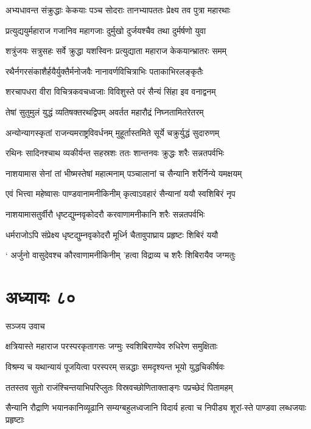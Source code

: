 \twolineshloka
{अभ्यधावन्त संक्रुद्धाः केकयाः पञ्च सोदराः}
{तानभ्यापततः प्रेक्ष्य तव पुत्रा महारथाः}


\twolineshloka
{प्रत्युद्ययुर्महाराज गजानिव महागजाः}
{दुर्मुखो दुर्जयश्चैव तथा दुर्मर्षणो युवा}


\twolineshloka
{शत्रुंजयः सत्रुसहः सर्वे क्रुद्धा यशस्विनः}
{प्रत्युद्याता महाराज केकयान्भ्रातरः समम्}


\twolineshloka
{रथैर्नगरसंकाशैर्हयैर्युक्तैर्मनोजवैः}
{नानावर्णविचित्राभिः पताकाभिरलङ्कृतैः}


\twolineshloka
{शरचापधरा वीरा विचित्रकवचध्वजाः}
{विविशुस्ते परं सैन्यं सिंहा इव वनाद्वनम्}


\twolineshloka
{तेषां सुतुमुलं युद्धं व्यतिषक्तरथद्विपम्}
{अवर्तत महारौद्रं निघ्नतामितरेतरम्}


\twolineshloka
{अन्योन्यागस्कृतां राजन्यमराष्ट्रविवर्धनम्}
{मुहूर्तास्तमिते सूर्ये चक्रुर्युद्धं सुदारुणम्}


\twolineshloka
{रथिनः सादिनश्चाथ व्यकीर्यन्त सहस्रशः}
{ततः शान्तनवः क्रुद्धः शरैः सन्नतपर्वभिः}


\twolineshloka
{नाशयामास सेनां तां भीष्मस्तेषां महात्मनाम्}
{पञ्चालानां च सैन्यानि शरैर्निन्ये यमक्षयम्}


\twolineshloka
{एवं भित्त्वा महेष्वासः पाण्डवानामनीकिनीम्}
{कृत्वाऽवहारं सैन्यानां ययौ स्वशिबिरं नृप}


\twolineshloka
{नाशयामासतुर्वीरौ धृष्टद्युम्नवृकोदरौ}
{करवाणामनीकानि शरैः सन्नतपर्वभिः}


\twolineshloka
{धर्मराजोऽपि संप्रेक्ष्य धृष्टद्युम्नवृकोदरौ}
{मूर्ध्नि चैतावुपाघ्राय प्रहृष्टः शिबिरं ययौ}


\twolineshloka
{` अर्जुनो वासुदेवश्च कौरवाणामनीकिनीम्}
{'हत्वा विद्राव्य च शरैः शिबिरायैव जग्मतुः}


\chapter{अध्यायः ८०}
\twolineshloka
{सञ्जय उवाच}
{}


\twolineshloka
{क्षत्रियास्ते महाराज परस्परकृतागसः}
{जग्मुः स्वशिबिराण्येव रुधिरेण समुक्षिताः}


\twolineshloka
{विश्रम्य च यथान्यायं पूजयित्वा परस्परम्}
{सन्नद्धाः समदृश्यन्त भूयो युद्धचिकीर्षवः}


\twolineshloka
{ततस्तव सुतो राजंश्चिन्तयाभिपरिप्लुतः}
{विस्रवच्छोणिताक्ताङ्गः पप्रच्छेदं पितामहम्}


\twolineshloka
{सैन्यानि रौद्राणि भयानकानिव्यूढानि सम्यग्बहुलध्वजानि}
{विदार्य हत्वा च निपीड्य शूरां-स्ते पाण्डवा लब्धजयाः प्रहृष्टाः}


